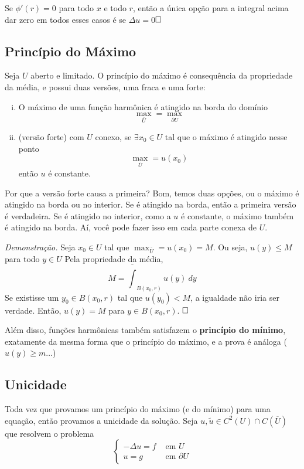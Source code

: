 \documentclass[11pt]{article}
\newcommand{\qed}{$\hfill\square$}
\newcommand{\p}{\partial}
\begin{document}
Se \( \phi'(r)=0 \) para todo \( x \) e todo \( r \), então a única opção para a integral acima dar zero em todos esses casos é se \( \Delta u =0 \)\qed 

\subsection{Princípio do Máximo}

Seja \( U \) aberto e limitado. O princípio do máximo é consequência da propriedade da média, e possui duas versões, uma fraca e uma forte: \begin{enumerate}[(i)]
	\item O máximo de uma função harmônica é atingido na borda do domínio \[ \max_{\overline{U}} = \max_{\p U} \] 
	
	\item (versão forte) com \( U \) conexo, se \( \exists x_0 \in U\) tal que o máximo é atingido nesse ponto \[ \max_{\overline{U}} = u(x_0) \] então \( u \) é constante.
\end{enumerate}

Por que a versão forte causa a primeira? Bom, temos duas opções, ou o máximo é atingido na borda ou no interior. Se é atingido na borda, então a primeira versão é verdadeira. Se é atingido no interior, como a \( u \) é constante, o máximo também é atingido na borda. Aí, você pode fazer isso em cada parte conexa de \( U \).

\textit{Demonstração.} Seja \( x_0 \in U \) tal que \( \max_{\overline{U}} = u(x_0)  = M\). Ou seja, \( u(y) \leq M \) para todo \( y \in U \) Pela propriedade da média, \[ M = \overline{\int}_{B(x_0,r)} u(y)\ dy\] Se existisse um \( y_0 \in B(x_0,r)\) tal que \( u(y_0)<M \), a igualdade não iria ser verdade. Então, \( u(y) = M \) para \( y \in B(x_0,r) \). \qed

Além disso, funções harmônicas também satisfazem o \textbf{princípio do mínimo}, exatamente da mesma forma que o princípio do máximo, e a prova é análoga (\( u(y) \geq m \ldots \))

\subsection{Unicidade}

Toda vez que provamos um princípio do máximo (e do mínimo) para uma equação, então provamos a unicidade da solução. Seja \( u, \tilde{u} \in C^2(U) \cap  C(\overline{U}) \) que resolvem o problema \[ \begin{cases}
	-\Delta u =f & \text{ em } U\\
	u = g & \text{ em } \p U
\end{cases} \]
\end{document}
